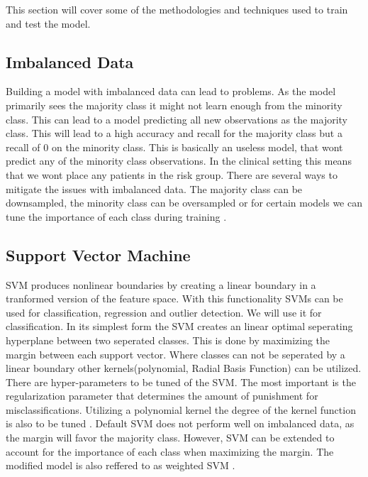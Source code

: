 This section will cover some of the methodologies and techniques used to train and test the model.

\subsection{Imbalanced Data}
Building a model with imbalanced data can lead to problems. As the model primarily sees the majority class it might not learn enough from the minority class. This can lead to a model predicting all new observations as the majority class. This will lead to a high accuracy and recall for the majority class but a recall of 0 on the minority class. This is basically an useless model, that wont predict any of the minority class observations. In the clinical setting this means that we wont place any patients in the risk group. There are several ways to mitigate the issues with imbalanced data. The majority class can be downsampled, the minority class can be oversampled or for certain models we can tune the importance of each class during training \cite*{svm-imbalanced-data}.

\subsection{Support Vector Machine}
SVM produces nonlinear boundaries by creating a linear boundary in a tranformed version of the feature space. With this functionality SVMs can be used for classification, regression and outlier detection. We will use it for classification. In its simplest form the SVM creates an linear optimal seperating hyperplane between two seperated classes. This is done by maximizing the margin between each support vector. Where classes can not be seperated by a linear boundary other kernels(polynomial, Radial Basis Function) can be utilized. There are hyper-parameters to be tuned of the SVM. The most important is the regularization parameter that determines the amount of punishment for misclassifications. Utilizing a polynomial kernel the degree of the kernel function is also to be tuned \cite{statistical-book}. Default SVM does not perform well on imbalanced data, as the margin will favor the majority class. However, SVM can be extended to account for the  importance of each class when maximizing the margin. The modified model is also reffered to as weighted SVM \cite{W-SVM}.
   
